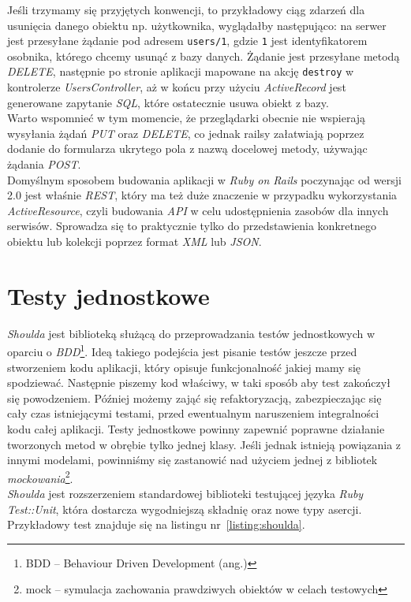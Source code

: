 \documentclass[12pt,twoside]{report}
\begin{document}
Jeśli trzymamy się przyjętych konwencji, to przykładowy ciąg zdarzeń dla usunięcia danego
obiektu np. użytkownika, wyglądałby następująco: na serwer jest przesyłane żądanie pod
adresem \texttt{users/1}, gdzie \texttt{1} jest identyfikatorem osobnika, którego chcemy
usunąć z bazy danych. Żądanie jest przesyłane metodą \emph{DELETE}, następnie po stronie
aplikacji mapowane na akcję \texttt{destroy} w kontrolerze \emph{UsersController},
aż w końcu przy użyciu \emph{ActiveRecord} jest generowane zapytanie \emph{SQL}, które
ostatecznie usuwa obiekt z bazy.\\
Warto wspomnieć w tym momencie, że przeglądarki obecnie nie wspierają wysyłania żądań
\emph{PUT} oraz \emph{DELETE}, co jednak railsy załatwiają poprzez dodanie do
formularza ukrytego pola z nazwą docelowej metody, używając żądania \emph{POST}.\\
Domyślnym sposobem budowania aplikacji w \emph{Ruby on Rails} poczynając od wersji 2.0
jest właśnie \emph{REST}, który ma też duże znaczenie w przypadku wykorzystania \emph{ActiveResource},
czyli budowania \emph{API} w celu udostępnienia zasobów dla innych
serwisów. Sprowadza się to praktycznie tylko do przedstawienia konkretnego obiektu lub
kolekcji poprzez format \emph{XML} lub \emph{JSON}.


\section{Testy jednostkowe}
\emph{Shoulda} jest biblioteką służącą do przeprowadzania testów jednostkowych w oparciu o
\emph{BDD}\footnote{BDD -- Behaviour Driven Development (ang.)}. Ideą takiego podejścia
jest pisanie testów jeszcze przed stworzeniem kodu aplikacji, który opisuje funkcjonalność
jakiej mamy się spodziewać. Następnie piszemy kod właściwy, w taki sposób aby test
zakończył się powodzeniem. Później możemy zająć się refaktoryzacją, zabezpieczając się
cały czas istniejącymi testami, przed ewentualnym naruszeniem integralności kodu całej
aplikacji. Testy jednostkowe powinny zapewnić poprawne działanie tworzonych metod w
obrębie tylko jednej klasy. Jeśli jednak istnieją powiązania z innymi modelami, powinniśmy
się zastanowić nad użyciem jednej z bibliotek \emph{mockowania}\footnote{mock -- symulacja
zachowania prawdziwych obiektów w celach testowych}.\\
\emph{Shoulda} jest rozszerzeniem standardowej biblioteki testującej języka \emph{Ruby}
\emph{Test::Unit}, która dostarcza wygodniejszą składnię oraz nowe typy asercji.
Przykładowy test znajduje się na listingu nr~\ref{listing:shoulda}.
\end{document}
